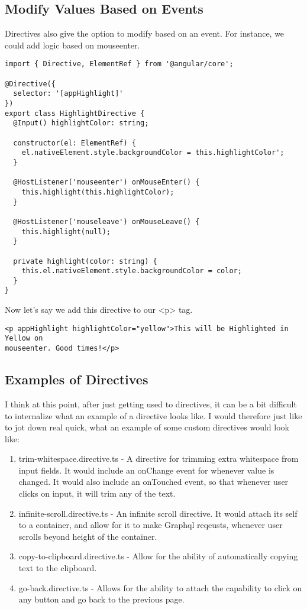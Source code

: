 \subsection{ Modify Values Based on Events }
Directives also give the option to modify based on an event. For instance,
we could add logic based on mouseenter.

\begin{lstlisting}
import { Directive, ElementRef } from '@angular/core';

@Directive({
  selector: '[appHighlight]'
})
export class HighlightDirective {
  @Input() highlightColor: string;

  constructor(el: ElementRef) {
    el.nativeElement.style.backgroundColor = this.highlightColor';
  }

  @HostListener('mouseenter') onMouseEnter() {
    this.highlight(this.highlightColor);
  }

  @HostListener('mouseleave') onMouseLeave() {
    this.highlight(null);
  }

  private highlight(color: string) {
    this.el.nativeElement.style.backgroundColor = color;
  }
}
\end{lstlisting}

Now let's say we add this directive to our <p> tag.

\begin{lstlisting}
<p appHighlight highlightColor="yellow">This will be Highlighted in Yellow on
mouseenter. Good times!</p>
\end{lstlisting}

\subsection{ Examples of Directives }
I think at this point, after just getting used to directives, it can be a bit
difficult to internalize what an example of a directive looks like. I would
therefore just like to jot down real quick, what an example of some custom
directives would look like:
\begin{enumerate}
  \item trim-whitespace.directive.ts - A directive for trimming extra whitespace
  from input fields. It would include an onChange event for whenever value is
  changed. It would also include an onTouched event, so that whenever user
  clicks on input, it will trim any of the text.
  \item infinite-scroll.directive.ts - An infinite scroll directive. It would
  attach its self to a container, and allow for it to make Graphql reqeusts,
  whenever user scrolls beyond height of the container.
  \item copy-to-clipboard.directive.ts - Allow for the ability of automatically
  copying text to the clipboard.
  \item go-back.directive.ts - Allows for the ability to attach the capability
  to click on any button and go back to the previous page.
\end{enumerate}
